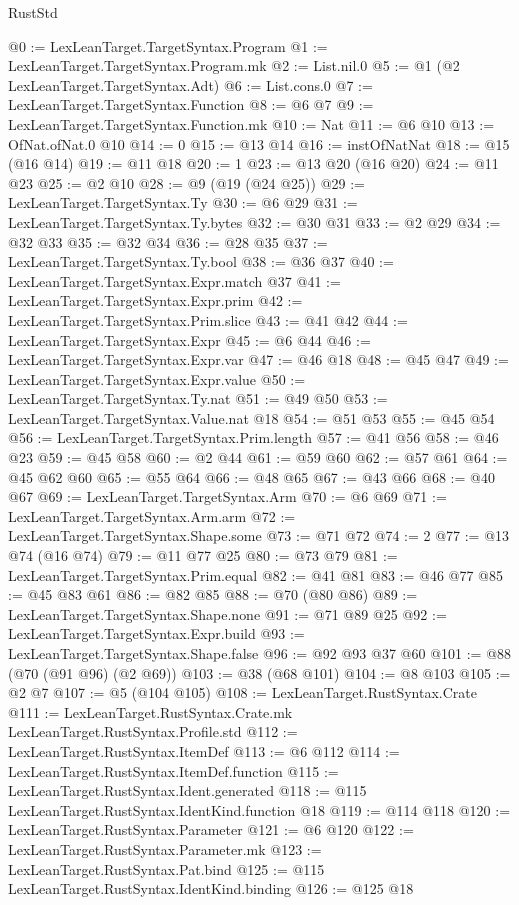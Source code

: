 \begin{lexlean}{RustStd}
\begin{coremodule}
@0 := LexLeanTarget.TargetSyntax.Program
@1 := LexLeanTarget.TargetSyntax.Program.mk
@2 := List.nil.{0}
@5 := @1 (@2 LexLeanTarget.TargetSyntax.Adt)
@6 := List.cons.{0}
@7 := LexLeanTarget.TargetSyntax.Function
@8 := @6 @7
@9 := LexLeanTarget.TargetSyntax.Function.mk
@10 := Nat
@11 := @6 @10
@13 := OfNat.ofNat.{0} @10
@14 := 0
@15 := @13 @14
@16 := instOfNatNat
@18 := @15 (@16 @14)
@19 := @11 @18
@20 := 1
@23 := @13 @20 (@16 @20)
@24 := @11 @23
@25 := @2 @10
@28 := @9 (@19 (@24 @25))
@29 := LexLeanTarget.TargetSyntax.Ty
@30 := @6 @29
@31 := LexLeanTarget.TargetSyntax.Ty.bytes
@32 := @30 @31
@33 := @2 @29
@34 := @32 @33
@35 := @32 @34
@36 := @28 @35
@37 := LexLeanTarget.TargetSyntax.Ty.bool
@38 := @36 @37
@40 := LexLeanTarget.TargetSyntax.Expr.match @37
@41 := LexLeanTarget.TargetSyntax.Expr.prim
@42 := LexLeanTarget.TargetSyntax.Prim.slice
@43 := @41 @42
@44 := LexLeanTarget.TargetSyntax.Expr
@45 := @6 @44
@46 := LexLeanTarget.TargetSyntax.Expr.var
@47 := @46 @18
@48 := @45 @47
@49 := LexLeanTarget.TargetSyntax.Expr.value
@50 := LexLeanTarget.TargetSyntax.Ty.nat
@51 := @49 @50
@53 := LexLeanTarget.TargetSyntax.Value.nat @18
@54 := @51 @53
@55 := @45 @54
@56 := LexLeanTarget.TargetSyntax.Prim.length
@57 := @41 @56
@58 := @46 @23
@59 := @45 @58
@60 := @2 @44
@61 := @59 @60
@62 := @57 @61
@64 := @45 @62 @60
@65 := @55 @64
@66 := @48 @65
@67 := @43 @66
@68 := @40 @67
@69 := LexLeanTarget.TargetSyntax.Arm
@70 := @6 @69
@71 := LexLeanTarget.TargetSyntax.Arm.arm
@72 := LexLeanTarget.TargetSyntax.Shape.some
@73 := @71 @72
@74 := 2
@77 := @13 @74 (@16 @74)
@79 := @11 @77 @25
@80 := @73 @79
@81 := LexLeanTarget.TargetSyntax.Prim.equal
@82 := @41 @81
@83 := @46 @77
@85 := @45 @83 @61
@86 := @82 @85
@88 := @70 (@80 @86)
@89 := LexLeanTarget.TargetSyntax.Shape.none
@91 := @71 @89 @25
@92 := LexLeanTarget.TargetSyntax.Expr.build
@93 := LexLeanTarget.TargetSyntax.Shape.false
@96 := @92 @93 @37 @60
@101 := @88 (@70 (@91 @96) (@2 @69))
@103 := @38 (@68 @101)
@104 := @8 @103
@105 := @2 @7
@107 := @5 (@104 @105)
@108 := LexLeanTarget.RustSyntax.Crate
@111 := LexLeanTarget.RustSyntax.Crate.mk LexLeanTarget.RustSyntax.Profile.std
@112 := LexLeanTarget.RustSyntax.ItemDef
@113 := @6 @112
@114 := LexLeanTarget.RustSyntax.ItemDef.function
@115 := LexLeanTarget.RustSyntax.Ident.generated
@118 := @115 LexLeanTarget.RustSyntax.IdentKind.function @18
@119 := @114 @118
@120 := LexLeanTarget.RustSyntax.Parameter
@121 := @6 @120
@122 := LexLeanTarget.RustSyntax.Parameter.mk
@123 := LexLeanTarget.RustSyntax.Pat.bind
@125 := @115 LexLeanTarget.RustSyntax.IdentKind.binding
@126 := @125 @18

\end{coremodule}
\end{lexlean}
